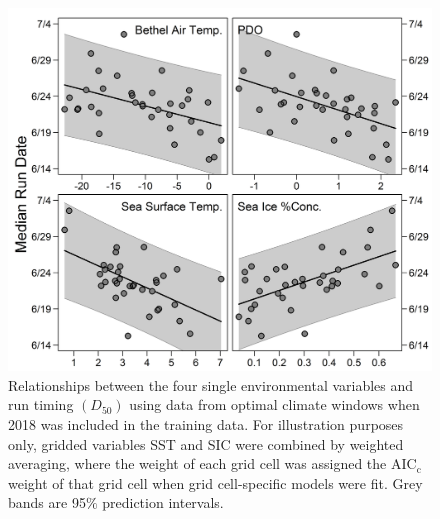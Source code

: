 \documentclass[12pt,]{book}
\theoremstyle{definition}
\theoremstyle{definition}
\theoremstyle{definition}
\theoremstyle{remark}
\begin{document}
\clearpage

\begin{figure}
  \centering
  \includegraphics{img/Ch2/relationships.png}
  \caption{Relationships between the four single environmental variables and run timing $\left(D_{50}\right)$ using data from optimal climate windows when 2018 was included in the training data. For illustration purposes only, gridded variables SST and SIC were combined by weighted averaging, where the weight of each grid cell was assigned the $\text{AIC}_{\text{c}}$ weight of that grid cell when grid cell-specific models were fit. Grey bands are 95$\%$ prediction intervals.}
  \label{fig:relationships}
\end{figure}

\clearpage
\end{document}
